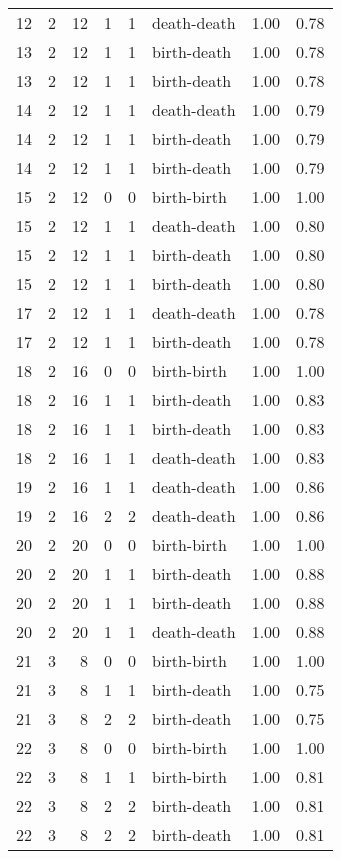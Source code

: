 \documentclass{article}
\begin{document}
\begin{center}
\begin{tabular}{rrrrrlrr}
12 & 2 & 12 & 1 & 1 & death-death & 1.00 & 0.78 \\
13 & 2 & 12 & 1 & 1 & birth-death & 1.00 & 0.78 \\
13 & 2 & 12 & 1 & 1 & birth-death & 1.00 & 0.78 \\
14 & 2 & 12 & 1 & 1 & death-death & 1.00 & 0.79 \\
14 & 2 & 12 & 1 & 1 & birth-death & 1.00 & 0.79 \\
14 & 2 & 12 & 1 & 1 & birth-death & 1.00 & 0.79 \\
15 & 2 & 12 & 0 & 0 & birth-birth & 1.00 & 1.00 \\
15 & 2 & 12 & 1 & 1 & death-death & 1.00 & 0.80 \\
15 & 2 & 12 & 1 & 1 & birth-death & 1.00 & 0.80 \\
15 & 2 & 12 & 1 & 1 & birth-death & 1.00 & 0.80 \\
17 & 2 & 12 & 1 & 1 & death-death & 1.00 & 0.78 \\
17 & 2 & 12 & 1 & 1 & birth-death & 1.00 & 0.78 \\
18 & 2 & 16 & 0 & 0 & birth-birth & 1.00 & 1.00 \\
18 & 2 & 16 & 1 & 1 & birth-death & 1.00 & 0.83 \\
18 & 2 & 16 & 1 & 1 & birth-death & 1.00 & 0.83 \\
18 & 2 & 16 & 1 & 1 & death-death & 1.00 & 0.83 \\
19 & 2 & 16 & 1 & 1 & death-death & 1.00 & 0.86 \\
19 & 2 & 16 & 2 & 2 & death-death & 1.00 & 0.86 \\
20 & 2 & 20 & 0 & 0 & birth-birth & 1.00 & 1.00 \\
20 & 2 & 20 & 1 & 1 & birth-death & 1.00 & 0.88 \\
20 & 2 & 20 & 1 & 1 & birth-death & 1.00 & 0.88 \\
20 & 2 & 20 & 1 & 1 & death-death & 1.00 & 0.88 \\
21 & 3 & 8 & 0 & 0 & birth-birth & 1.00 & 1.00 \\
21 & 3 & 8 & 1 & 1 & birth-death & 1.00 & 0.75 \\
21 & 3 & 8 & 2 & 2 & birth-death & 1.00 & 0.75 \\
22 & 3 & 8 & 0 & 0 & birth-birth & 1.00 & 1.00 \\
22 & 3 & 8 & 1 & 1 & birth-birth & 1.00 & 0.81 \\
22 & 3 & 8 & 2 & 2 & birth-death & 1.00 & 0.81 \\
22 & 3 & 8 & 2 & 2 & birth-death & 1.00 & 0.81 \\

\end{tabular}
\end{center}
\end{document}
